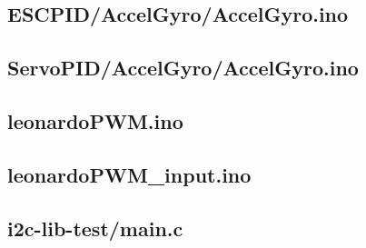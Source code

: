 \documentclass[a4paper,11pt]{article}
\begin{document}
\subsection{ESCPID/AccelGyro/AccelGyro.ino}

\subsection{ServoPID/AccelGyro/AccelGyro.ino}

\subsection{leonardoPWM.ino}

\subsection{leonardoPWM\_input.ino}

   \subsection{i2c-lib-test/main.c}
 
\end{document}
